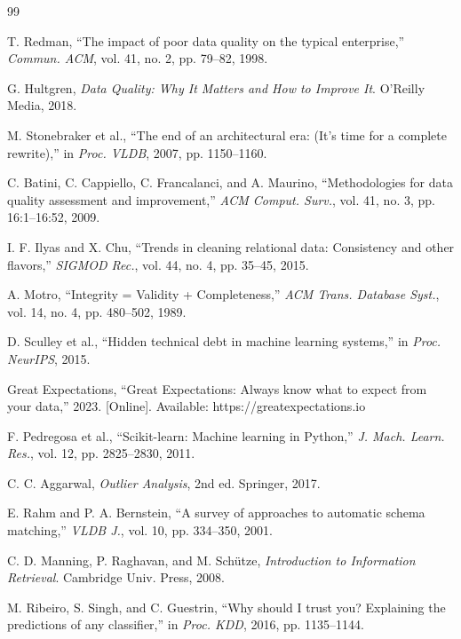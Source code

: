 \documentclass{ieeeaccess}
\begin{document}
\begin{thebibliography}{99}

T. Redman, ``The impact of poor data quality on the typical enterprise,'' \textit{Commun. ACM}, vol. 41, no. 2, pp. 79--82, 1998.

G. Hultgren, \textit{Data Quality: Why It Matters and How to Improve It}. O'Reilly Media, 2018.

M. Stonebraker et al., ``The end of an architectural era: (It's time for a complete rewrite),'' in \textit{Proc. VLDB}, 2007, pp. 1150--1160.

C. Batini, C. Cappiello, C. Francalanci, and A. Maurino, ``Methodologies for data quality assessment and improvement,'' \textit{ACM Comput. Surv.}, vol. 41, no. 3, pp. 16:1--16:52, 2009.

I. F. Ilyas and X. Chu, ``Trends in cleaning relational data: Consistency and other flavors,'' \textit{SIGMOD Rec.}, vol. 44, no. 4, pp. 35--45, 2015.

A. Motro, ``Integrity = Validity + Completeness,'' \textit{ACM Trans. Database Syst.}, vol. 14, no. 4, pp. 480--502, 1989.

D. Sculley et al., ``Hidden technical debt in machine learning systems,'' in \textit{Proc. NeurIPS}, 2015.

Great Expectations, ``Great Expectations: Always know what to expect from your data,'' 2023. [Online]. Available: https://greatexpectations.io

F. Pedregosa et al., ``Scikit-learn: Machine learning in Python,'' \textit{J. Mach. Learn. Res.}, vol. 12, pp. 2825--2830, 2011.

C. C. Aggarwal, \textit{Outlier Analysis}, 2nd ed. Springer, 2017.

E. Rahm and P. A. Bernstein, ``A survey of approaches to automatic schema matching,'' \textit{VLDB J.}, vol. 10, pp. 334--350, 2001.

C. D. Manning, P. Raghavan, and M. Sch\"{u}tze, \textit{Introduction to Information Retrieval}. Cambridge Univ. Press, 2008.

M. Ribeiro, S. Singh, and C. Guestrin, ``Why should I trust you? Explaining the predictions of any classifier,'' in \textit{Proc. KDD}, 2016, pp. 1135--1144.


\end{thebibliography}
\end{document}
